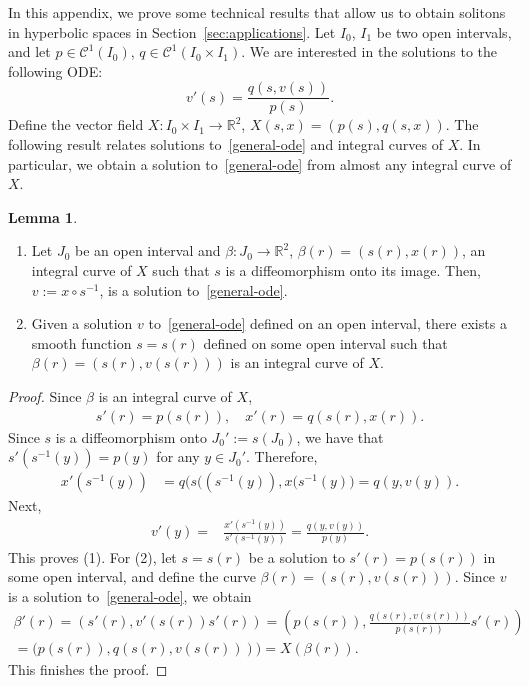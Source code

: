 \documentclass[oneside,12pt]{amsart}
\theoremstyle{definition}
\newtheorem{lemma}{Lemma}
\newcommand{\R}{\mathbb{R}}
\begin{document}
In this appendix, we prove some technical results that allow us to obtain solitons in hyperbolic spaces in Section~\ref{sec:applications}. Let $I_0$, $I_1$ be two open intervals,  and let $p\in \mathcal{C}^1(I_0)$, $q\in \mathcal{C}^1(I_0\times I_1)$. We are interested in the solutions to the following ODE:
\begin{equation}\label{general-ode}
v'(s)=\frac{q(s,v(s))}{p(s)}.
\end{equation}
Define the vector field $X:I_0\times I_1\to\R^2$, $X(s,x)=(p(s),q(s,x))$.
The following result relates solutions to~\eqref{general-ode} and integral curves of $X$. In particular, we obtain a solution to~\eqref{general-ode} from almost any integral curve of $X$. 
\begin{lemma} \label{integralcurves}
\begin{enumerate}
\item Let $J_0$ be an open interval and $\beta:J_0 \to \R^2$, $\beta(r)=(s(r),x(r))$, an  integral curve of $X$ such that $s$ is a diffeomorphism onto its image. Then, $v:=x\circ s^{-1}$, is a solution to~\eqref{general-ode}. 
\item Given a solution $v$ to~\eqref{general-ode} defined on an open interval, there exists a smooth function $s=s(r)$ defined on some open interval such that $\beta(r)=(s(r),v(s(r)))$ is an integral curve of $X$.
\end{enumerate}
\end{lemma}
\begin{proof} Since $\beta$ is an integral curve of $X$, 
\begin{align*}s'(r)=p(s(r)), \quad
x'(r)=q(s(r),x(r)).
\end{align*}
Since $s$ is a diffeomorphism onto $J_0' := s(J_0)$, we have that $s'(s^{-1}(y))=p(y)$ for any $y\in J_0'$.
Therefore,
\begin{align*}
x'(s^{-1}(y)) & = q\big(s((s^{-1}(y)),x(s^{-1}(y)\big)=q(y,v(y)). \end{align*}
Next,
\begin{align*}
v'(y)=&\frac{x'(s^{-1}(y))}{s'(s^{-1}(y))} =
\frac{ q(y,v(y))}{p(y)}.
\end{align*}
This proves (1). For (2), let $s=s(r)$ be a solution to $s'(r)=p(s(r))$ in some open interval, and define the curve $\beta(r)=(s(r),v(s(r)))$. Since $v$ is a solution to~\eqref{general-ode}, we obtain
\begin{gather*}
\beta'(r)  = (s'(r), v'(s(r))s'(r)) = \left(p(s(r)),\frac{q(s(r),v(s(r)))}{p(s(r))}s'(r)\right)\\
=\big(p(s(r)),q(s(r),v(s(r)))\big)=X(\beta(r)).
\end{gather*}
This finishes the proof.\end{proof}
\end{document}
